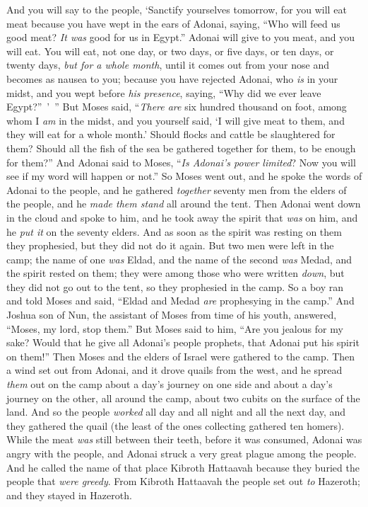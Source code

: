 \begin{biblechapter}
\verse And you will say to the people, ‘Sanctify yourselves tomorrow, for you will eat meat because you have wept in the ears of Adonai, saying, “Who will feed us good meat? \textit{It was} good for us in Egypt.” Adonai will give to you meat, and you will eat.
\verse You will eat, not one day, or two days, or five days, or ten days, or twenty days,
\verse \textit{but for a whole month}, until it comes out from your nose and becomes as nausea to you; because you have rejected Adonai, who \textit{is} in your midst, and you wept before \textit{his presence}, saying, “Why did we ever leave Egypt?” ’ ”
\verse But Moses said, “\textit{There are} six hundred thousand on foot, among whom I \textit{am} in the midst, and you yourself said, ‘I will give meat to them, and they will eat for a whole month.’
\verse Should flocks and cattle be slaughtered for them? Should all the fish of the sea be gathered together for them, to be enough for them?”
\verse And Adonai said to Moses, “\textit{Is Adonai’s power limited}? Now you will see if my word will happen or not.”
\verse So Moses went out, and he spoke the words of Adonai to the people, and he gathered \textit{together} seventy men from the elders of the people, and he \textit{made them stand} all around the tent.
\verse Then Adonai went down in the cloud and spoke to him, and he took away the spirit that \textit{was} on him, and he \textit{put it} on the seventy elders. And as soon as the spirit was resting on them they prophesied, but they did not do it again.
\verse But two men were left in the camp; the name of one \textit{was} Eldad, and the name of the second \textit{was} Medad, and the spirit rested on them; they were among those who were written \textit{down}, but they did not go out to the tent, so they prophesied in the camp.
\verse So a boy ran and told Moses and said, “Eldad and Medad \textit{are} prophesying in the camp.”
\verse And Joshua son of Nun, the assistant of Moses from time of his youth, answered, “Moses, my lord, stop them.”
\verse But Moses said to him, “Are you jealous for my sake? Would that he give all Adonai’s people prophets, that Adonai put his spirit on them!”
\verse Then Moses and the elders of Israel were gathered to the camp.
 Then a wind set out from Adonai, and it drove quails from the west, and he spread \textit{them} out on the camp about a day’s journey on one side and about a day’s journey on the other, all around the camp, about two cubits on the surface of the land.
\verse And so the people \textit{worked} all day and all night and all the next day, and they gathered the quail (the least of the ones collecting gathered ten homers).
\verse While the meat \textit{was} still between their teeth, before it was consumed, Adonai was angry with the people, and Adonai struck a very great plague among the people.
\verse And he called the name of that place Kibroth Hattaavah because they buried the people that \textit{were greedy}.
\verse From Kibroth Hattaavah the people set out \textit{to} Hazeroth; and they stayed in Hazeroth.
\end{biblechapter}

